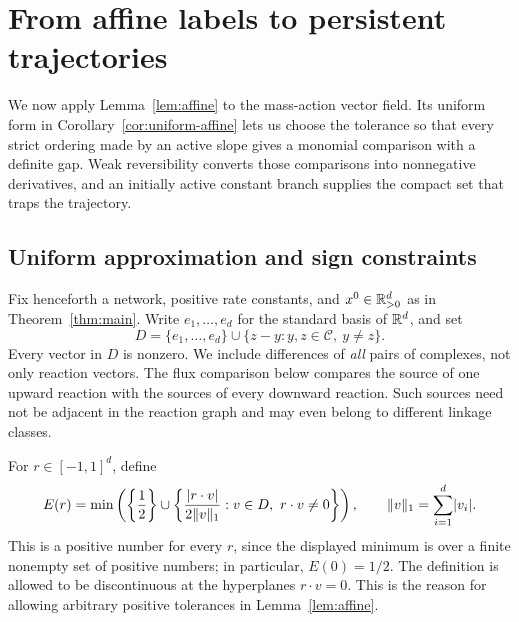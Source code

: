 \section{From affine labels to persistent trajectories}
\label{sec:dynamics}

We now apply Lemma~\ref{lem:affine} to the mass-action vector field.
Its uniform form in Corollary~\ref{cor:uniform-affine} lets us choose
the tolerance so that every strict ordering made by an active slope gives
a monomial comparison with a definite gap. Weak reversibility converts those comparisons into
nonnegative derivatives, and an initially active constant branch supplies
the compact set that traps the trajectory.

\subsection{Uniform approximation and sign constraints}

Fix henceforth a network, positive rate constants, and
$x^0\in\mathbb R_{>0}^d$ as in Theorem~\ref{thm:main}. Write $e_1,\ldots,e_d$
for the standard basis of $\mathbb R^d$, and set
\begin{equation}\label{eq:comparison-directions}
 D=\{e_1,\ldots,e_d\}
 \cup\{z-y:y,z\in\mathcal C,\ y\ne z\}.
\end{equation}
Every vector in $D$ is nonzero. We include differences of \emph{all}
pairs of complexes, not only reaction vectors. The flux comparison below
compares the source of one upward reaction with the sources of every
downward reaction. Such sources need not be adjacent in the reaction
graph and may even belong to different linkage classes.

For $r\in[-1,1]^d$, define
\begin{equation}\label{eq:chosen-tolerance}
 E(r)=\min\left(
 \left\{\frac12\right\}
 \cup
 \left\{
 \frac{\lvert r\cdot v\rvert}{2\lVert v\rVert_1}:
 v\in D,\ r\cdot v\ne0
 \right\}\right),
 \qquad \lVert v\rVert_1=\sum_{i=1}^d\lvert v_i\rvert.
\end{equation}
This is a positive number for every $r$, since the displayed minimum is
over a finite nonempty set of positive numbers; in particular,
$E(0)=1/2$. The definition is allowed to be discontinuous at the
hyperplanes $r\cdot v=0$. This is the reason for allowing arbitrary
positive tolerances in Lemma~\ref{lem:affine}.

